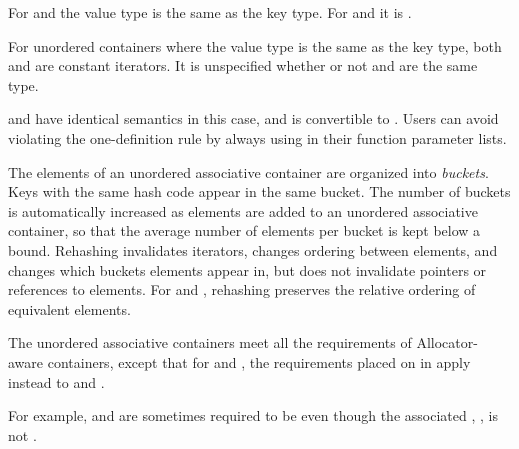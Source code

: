 \pnum
For  and  the value type is
the same as the key type.  For  and
 it is .

\pnum
For unordered containers where the value type is the same as the key
type, both  and  are constant
iterators. It is unspecified whether or not  and
 are the same type.
\begin{note}  and  have identical
semantics in this case, and  is convertible to
. Users can avoid violating the one-definition rule
by always using  in their function parameter lists.
\end{note}

\pnum
{}%
%
The elements of an unordered associative container are organized into
\textit{buckets}.  Keys with the same hash code appear in the same
bucket.  The number of buckets is automatically increased as elements
are added to an unordered associative container, so that the average
number of elements per bucket is kept below a bound.  Rehashing
invalidates iterators, changes ordering between elements, and changes
which buckets elements appear in, but does not invalidate pointers or
references to elements. For  and
, rehashing preserves the relative ordering of
equivalent elements.

\pnum
The unordered associative containers meet all the requirements of Allocator-aware
containers, except that for
 and , the requirements placed on 
in  apply instead to 
and . \begin{note} For example,  and 
are sometimes required to be  even though the associated
, , is not
. \end{note}

